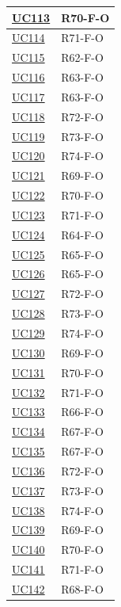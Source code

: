 \begin{longtable}{|p{2.8cm}|p{10.2cm}|}
	\hyperlink{uc113}{UC113} & R70-F-O \\ \hline
	\hyperlink{uc114}{UC114} & R71-F-O \\ \hline
	\hyperlink{uc115}{UC115} & R62-F-O \\ \hline
	\hyperlink{uc116}{UC116} & R63-F-O \\ \hline
	\hyperlink{uc117}{UC117} & R63-F-O \\ \hline
	\hyperlink{uc118}{UC118} & R72-F-O \\ \hline
	\hyperlink{uc119}{UC119} & R73-F-O \\ \hline
	\hyperlink{uc120}{UC120} & R74-F-O \\ \hline
	\hyperlink{uc121}{UC121} & R69-F-O \\ \hline
	\hyperlink{uc122}{UC122} & R70-F-O \\ \hline
	\hyperlink{uc123}{UC123} & R71-F-O \\ \hline
	\hyperlink{uc124}{UC124} & R64-F-O \\ \hline
	\hyperlink{uc125}{UC125} & R65-F-O \\ \hline
	\hyperlink{uc126}{UC126} & R65-F-O \\ \hline
	\hyperlink{uc127}{UC127} & R72-F-O \\ \hline
	\hyperlink{uc128}{UC128} & R73-F-O \\ \hline
	\hyperlink{uc129}{UC129} & R74-F-O \\ \hline
	\hyperlink{uc130}{UC130} & R69-F-O \\ \hline
	\hyperlink{uc131}{UC131} & R70-F-O \\ \hline
	\hyperlink{uc132}{UC132} & R71-F-O \\ \hline
	\hyperlink{uc133}{UC133} & R66-F-O \\ \hline
	\hyperlink{uc134}{UC134} & R67-F-O \\ \hline
	\hyperlink{uc135}{UC135} & R67-F-O \\ \hline
	\hyperlink{uc136}{UC136} & R72-F-O \\ \hline
	\hyperlink{uc137}{UC137} & R73-F-O \\ \hline
	\hyperlink{uc138}{UC138} & R74-F-O \\ \hline
	\hyperlink{uc139}{UC139} & R69-F-O \\ \hline
	\hyperlink{uc140}{UC140} & R70-F-O \\ \hline
	\hyperlink{uc141}{UC141} & R71-F-O \\ \hline
	\hyperlink{uc142}{UC142} & R68-F-O \\ \hline


\end{longtable}
